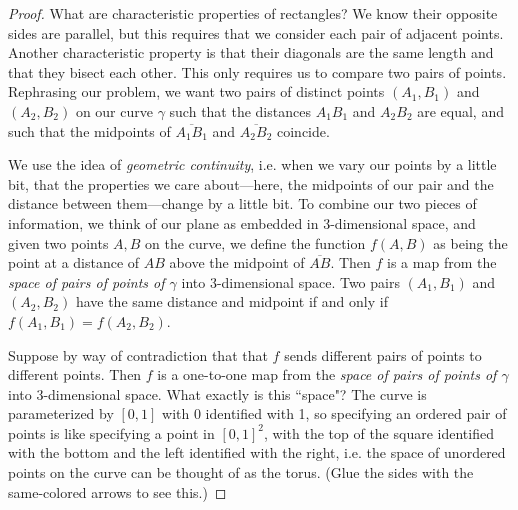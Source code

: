 \documentclass[12pt,twoside]{article}
\theoremstyle{norm}
\begin{document}
\begin{proof}
What are characteristic properties of rectangles? We know their opposite sides are parallel, but this requires that we consider each pair of adjacent points. Another characteristic property is that their diagonals are the same length and that they bisect each other. This only requires us to compare two pairs of points. Rephrasing our problem, we want two pairs of distinct points $(A_1,B_1)$ and $(A_2,B_2)$ on our curve $\gamma$ such that the distances $A_1B_1$ and $A_2B_2$ are equal, and such that the midpoints of $\overline{A_1B_1}$ and $\overline{A_2B_2}$ coincide.

We use the idea of {\it geometric continuity}, i.e. when we vary our points by a little bit, that the properties we care about---here, the midpoints of our pair and the distance between them---change by a little bit. To combine our two pieces of information, we think of our plane as embedded in 3-dimensional space, and given two points $A,B$ on  the curve, we define the function $f(A,B)$ as being the point at a distance of $AB$ above the midpoint of $\overline{AB}$. Then $f$ is a map from the {\it space of pairs of points of $\gamma$} into 3-dimensional space. 
Two pairs $(A_1,B_1)$ and $(A_2,B_2)$ have the same distance and midpoint if and only if $f(A_1,B_1)=f(A_2,B_2)$.

\begin{figure}[h!]
\end{figure}

Suppose by way of contradiction that that $f$ sends different pairs of points to different points. Then $f$ is a one-to-one map from the {\it space of pairs of points of $\gamma$} into 3-dimensional space. What exactly is this ``space"? The curve is parameterized by $[0,1]$ with 0 identified with 1, so specifying an ordered pair of points is like specifying a point in $[0,1]^2$, with the top of the square identified with the bottom and the left identified with the right, i.e. the space of unordered points on the curve can be thought of as the torus. (Glue the sides with the same-colored arrows to see this.)


\end{proof}
\end{document}
